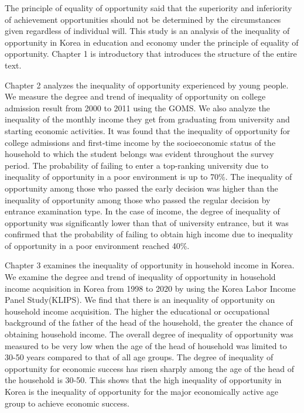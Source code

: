 \documentclass[oneside,ko,phd]{snuthesis}
\begin{document}
\begin{abstractalt}
    \noindent
The principle of equality of opportunity said that the superiority and inferiority of achievement opportunities should not be determined by the circumstances given regardless of individual will. This study is an analysis of the inequality of opportunity in Korea in education and economy under the principle of equality of opportunity. Chapter 1 is introductory that introduces the structure of the entire text.

Chapter 2 analyzes the inequality of opportunity experienced by young people. We measure the degree and trend of inequality of opportunity on college admission result from 2000 to 2011 using the GOMS. We also analyze the inequality of the monthly income they get from graduating from university and starting economic activities. It was found that the inequality of opportunity for college admissions and first-time income by the socioeconomic status of the household to which the student belongs was evident throughout the survey period. The probability of failing to enter a top-ranking university due to inequality of opportunity in a poor environment is up to 70\%. The inequality of opportunity among those who passed the early decision was higher than the inequality of opportunity among those who passed the regular decision by entrance examination type. In the case of income, the degree of inequality of opportunity was significantly lower than that of university entrance, but it was confirmed that the probability of failing to obtain high income due to inequality of opportunity in a poor environment reached 40\%.

Chapter 3 examines the inequality of opportunity in household income in Korea. We examine the degree and trend of inequality of opportunity in household income acquisition in Korea from 1998 to 2020 by using the Korea Labor Income Panel Study(KLIPS). We find that there is an inequality of opportunity on household income acquisition. The higher the educational or occupational background of the father of the head of the household, the greater the chance of obtaining household income.  The overall degree of inequality of opportunity was measured to be very low when the age of the head of household was limited to 30-50 years compared to that of all age groups. The degree of inequality of opportunity for economic success has risen sharply among the age of the head of the household is 30-50. This shows that the high inequality of opportunity in Korea is the inequality of opportunity for the major economically active age group to achieve economic success.


\end{abstractalt}
\end{document}
